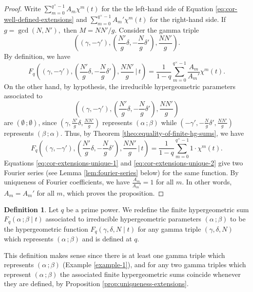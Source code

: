 \documentclass[11pt, reqno]{amsart}
\theoremstyle{plain}
\theoremstyle{definition}
\newtheorem{defi}[theo]{Definition}
\newcommand{\ga}{\gamma}
\newcommand{\be}{\beta}
\newcommand{\al}{\alpha}
\begin{document}
\begin{proof}
    Write $\sum_{m=0}^{q^\times-1} A_m \chi^{m}(t)$ for the the left-hand side of Equation \eqref{eq:cor-well-defined-extensions} and $\sum_{m=0}^{q^\times-1} A_m' \chi^{m}(t)$ for the right-hand side. 
    If $g=\gcd(N,N'), $ then $M= NN'/g.$
    Consider the gamma triple
    \[
    \left((\ga,-\ga'),\left( \frac{N'}{g}\delta, -\frac{N}{g}\delta'\right), \frac{NN'}{g} \right).
    \]
    By definition, we have
    \begin{equation}
    F_q\left((\ga,-\ga'),\left( \frac{N'}{g}\delta, -\frac{N}{g}\delta' \right), \frac{NN'}{g}  \,  \bigg | \, t\right) = \frac{1}{1-q}\sum_{m=0}^{q^\times-1} \frac{A_m}{A_m'} \chi^{m}(t). \label{eq:cor-extensions-unique-1}
    \end{equation}
    On the other hand, by hypothesis, the irreducible hypergeometric parameters associated to 
    \[
    \left((\ga,-\ga'),\left( \frac{N'}{g}\delta, -\frac{N}{g}\delta' \right), \frac{NN'}{g} \right)
    \]
    are $(\emptyset \,;\emptyset)$, since $\left(\ga, \frac{N'}{g} \delta, \frac{NN'}{g}\right)$ represents $(\al \,;\be)$ while  $\left(-\ga', -\frac{N}{g} \delta', \frac{NN'}{g}\right)$ represents $(\be\, ;\al)$. 
    Thus, by Theorem \ref{theo:equality-of-finite-hg-sums}, we have 
    \begin{equation}
    F_q\left((\ga,-\ga'),\left( \frac{N'}{g}\delta, -\frac{N}{g}\delta' \right), \frac{NN'}{g}  \,  \bigg | \, t\right) = \frac{1}{1-q}\sum_{m=0}^{q^\times-1} 1\cdot  \chi^{m}(t). \label{eq:cor-extensions-unique-2}
    \end{equation}
    Equations \eqref{eq:cor-extensions-unique-1} and \eqref{eq:cor-extensions-unique-2} give two Fourier series (see Lemma \ref{lem:fourier-series} below) for the same function. By uniqueness of Fourier coefficients, we have $\frac{A_m}{A_m'}=1$ for all $m$. In other words, $A_m =A_m'$ for all $m$, which proves the proposition.
\end{proof}


\begin{defi}
Let $q$ be a prime power. We redefine the finite hypergeometric sum $F_q(\al \, ; \be \mid t)$ associated to irreducible hypergeometric parameters $(\al \, ;\be)$ to be the hypergeometric function $F_q(\ga,\delta,N \mid t)$ for any gamma triple $(\ga,\delta,N)$ which represents $(\al \, ; \be)$ and is defined at $q$. 
\end{defi}
This definition makes sense since there is at least one gamma triple which represents $(\al \,; \be)$ (Example \ref{example-1}), and for any two gamma triples which represent $(\al\, ;\be)$ the associated finite hypergeometric sums coincide whenever they are defined, by Proposition \ref{prop:uniqueness-extensions}. 
\end{document}
